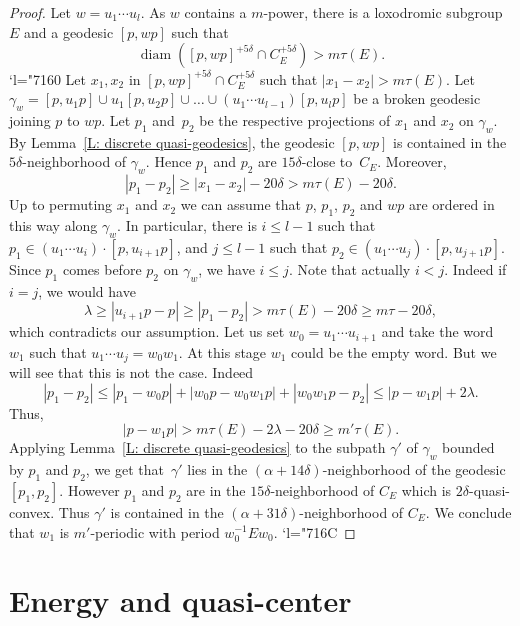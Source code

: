\documentclass[11pt]{article}
\newcommand{\Changel}{\mathcode`l="7160}
\newcommand{\Changelback}{\mathcode`l="716C}
\theoremstyle{plain}
\theoremstyle{definition}
\DeclareMathOperator{\diam}{diam}
\begin{document}
\begin{proof}
Let $w=u_1\cdots u_l$.
As $w$ contains a $m$-power, there is a loxodromic subgroup~$E$ and a geodesic $[p,wp]$ such that
\[
\diam([p,wp]^{+5\delta} \cap C_E^{+5\delta}) > m \tau(E).
\]
\Changel
Let $x_1, x_2$ in $[p,wp]^{+5\delta} \cap C_E^{+5\delta}$ such that $|x_1 - x_2| > m \tau(E)$.
Let $\gamma_w= [p,u_1p] \cup u_1[p,u_2p] \cup \ldots \cup (u_1\cdots u_{l-1})[p,u_lp]$ be a broken geodesic joining $p$ to $wp$.
Let $p_1$ and~$p_2$ be the respective projections of $x_1$ and $x_2$ on $\gamma_w$.
By Lemma~\ref{L: discrete quasi-geodesics}, the geodesic $[p,wp]$ is contained in the $5\delta$-neighborhood of $\gamma_w$.
Hence $p_1$ and $p_2$ are $15\delta$-close to~$C_E$.
Moreover,
\[
|p_1 -p_2| \geqslant |x_1-x_2| - 20\delta > m \tau(E) - 20\delta.
\]
Up to permuting $x_1$ and $x_2$ we can assume that $p$, $p_1$, $p_2$ and $wp$ are ordered in this way along $\gamma_w$.
In particular, there is $i \leqslant l-1$ such that $p_1 \in (u_1\cdots u_i) \cdot [ p, u_{i+1} p]$, and $j\leqslant l-1$ such that $p_2 \in (u_1\cdots u_j) \cdot [ p, u_{j+1} p]$.
Since $p_1$ comes before $p_2$ on $\gamma_w$, we have $i \leq j$.
Note that actually $i < j$.
Indeed if $i=j$, we would have
\begin{equation*}
\lambda \geq |u_{i+1}p -p| \geq |p_1-p_2| > m \tau(E) - 20\delta \geq m\tau - 20\delta,
\end{equation*}
which contradicts our assumption.
Let us set $w_0=u_1\cdots u_{i+1}$ and take the word $w_1$ such that $u_1\cdots u_j = w_0w_1 $.
At this stage $w_1$ could be the empty word.
But we will see that this is not the case.
Indeed
\[
|p_1 -p_2| \leqslant |p_1 - w_0p| + |w_0p-w_0w_1p| + |w_0w_1p-p_2| \leqslant |p-w_1p|+2\lambda.
\]
Thus,
\[
|p-w_1p|>
m \tau(E) -2 \lambda - 20\delta
\geq m' \tau(E).
\]
Applying Lemma~\ref{L: discrete quasi-geodesics} to the subpath $\gamma'$ of $\gamma_w$ bounded by $p_1$ and $p_2$, we get that~$\gamma'$ lies in the $(\alpha + 14\delta)$-neighborhood of the geodesic $[p_1, p_2]$.
However $p_1$ and $p_2$ are in the $15\delta$-neighborhood of $C_E$ which is $2\delta$-quasi-convex.
Thus $\gamma'$ is contained in the $(\alpha +31\delta)$-neighborhood of $C_E$.
We conclude that $w_1$ is $m'$-periodic with period $w_0^{-1}Ew_0$.
\Changelback
\end{proof}

\section{Energy and quasi-center}
\end{document}
